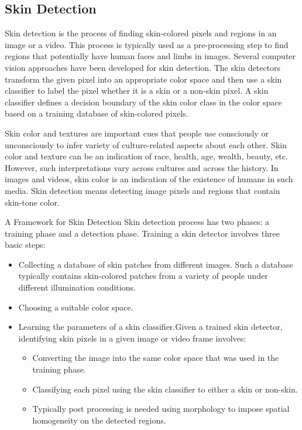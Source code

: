 \documentclass[a4paper,12pt]{article}
\begin{document}
\subsection{Skin Detection}

Skin detection is the process of finding skin-colored pixels and regions in an image or a
video. This process is typically used as a pre-processing step to find regions that potentially 
have human faces and limbs in images. Several computer vision approaches have been developed for skin detection. 
The skin detectors transform the given pixel into an appropriate color space and then use a skin classifier 
to label the pixel whether it is a skin or a non-skin pixel. A skin classifier defines a decision boundary of 
the skin color class in the color space based on a training database of skin-colored pixels.

Skin color and textures are important cues that people use consciously or unconsciously to infer variety of culture-related 
aspects about each other. Skin color and texture can be an indication of race, health, age, wealth, beauty, etc. 
However, such interpretations vary across cultures and across the history. In images and videos, skin color is an indication of 
the existence of humans in such media. Skin detection means detecting image pixels and regions that contain skin-tone color.


A Framework for Skin Detection Skin detection process has two phases: a training phase and a detection phase. 
Training a skin detector involves three basic steps: 

\begin{itemize}
 \item Collecting a database of skin patches from different images. Such a database typically contains skin-colored patches from a 
  variety of people under different illumination conditions.
 \item Choosing a suitable color space.
 \item Learning the parameters of a skin classifier.Given a trained skin detector, identifying skin pixels in a given image or 
  video frame involves: 
  \begin{itemize}
    \item	Converting the image into the same color space that was used in the training phase. 
    \item	Classifying each pixel using the skin classifier to either a skin or non-skin. 
    \item	Typically post processing is needed using morphology to impose spatial homogeneity on the detected regions.
  \end{itemize}
\end{itemize} 
\end{document}
